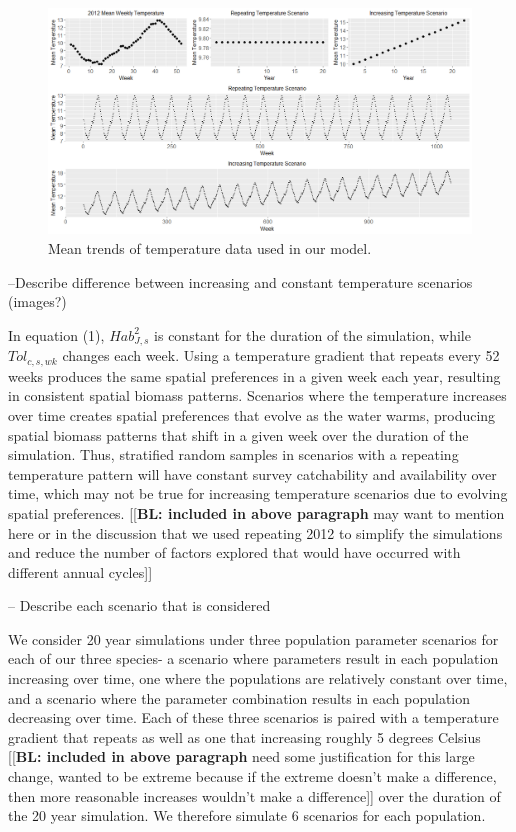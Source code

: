 \documentclass[
  12pt,
]{article}
\begin{document}
\begin{figure}

{\centering \includegraphics[width=0.95\linewidth]{Images/TempScenarios} 

}

\caption{Mean trends of temperature data used in our model.}\label{fig:temp-scenarios}
\end{figure}

--Describe difference between increasing and constant temperature scenarios (images?)

In equation (1), \(Hab^2_{J,s}\) is constant for the duration of the simulation, while \(Tol_{c,s,wk}\) changes each week. Using a temperature gradient that repeats every 52 weeks produces the same spatial preferences in a given week each year, resulting in consistent spatial biomass patterns. Scenarios where the temperature increases over time creates spatial preferences that evolve as the water warms, producing spatial biomass patterns that shift in a given week over the duration of the simulation. Thus, stratified random samples in scenarios with a repeating temperature pattern will have constant survey catchability and availability over time, which may not be true for increasing temperature scenarios due to evolving spatial preferences. {[}{[}\textbf{BL: included in above paragraph} may want to mention here or in the discussion that we used repeating 2012 to simplify the simulations and reduce the number of factors explored that would have occurred with different annual cycles{]}{]}

-- Describe each scenario that is considered

We consider 20 year simulations under three population parameter scenarios for each of our three species- a scenario where parameters result in each population increasing over time, one where the populations are relatively constant over time, and a scenario where the parameter combination results in each population decreasing over time. Each of these three scenarios is paired with a temperature gradient that repeats as well as one that increasing roughly 5 degrees Celsius {[}{[}\textbf{BL: included in above paragraph} need some justification for this large change, wanted to be extreme because if the extreme doesn't make a difference, then more reasonable increases wouldn't make a difference{]}{]} over the duration of the 20 year simulation. We therefore simulate 6 scenarios for each population.
\end{document}
